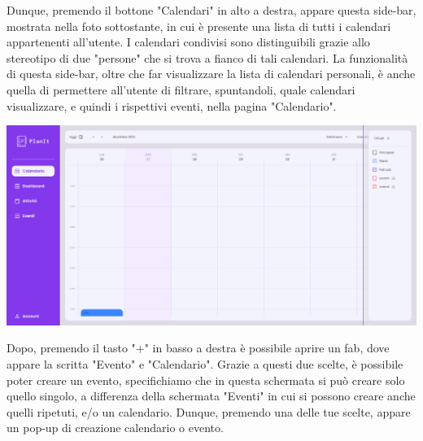 Dunque, premendo il bottone "Calendari" in alto a destra, appare questa side-bar, mostrata nella foto sottostante, in cui è presente una lista di tutti i calendari appartenenti all'utente. I calendari condivisi sono distinguibili grazie allo stereotipo di due "persone" che si trova a fianco di tali calendari. La funzionalità di questa side-bar, oltre che far visualizzare la lista di calendari personali, è anche quella di permettere all'utente di filtrare, spuntandoli, quale calendari visualizzare, e quindi i rispettivi eventi, nella pagina "Calendario".

\begin{center}
    \includegraphics[width=1\textwidth, height=0.3\textheight]{img/png/FrontEnd/Calendario/calendario_calendari.png}
\end{center}

Dopo, premendo il tasto "+" in basso a destra è possibile aprire un fab, dove appare la scritta "Evento" e "Calendario". Grazie a questi due scelte, è possibile poter creare un evento, specifichiamo che in questa schermata si può creare solo quello singolo, a differenza della schermata "Eventi" in cui si possono creare anche quelli ripetuti, e/o un calendario. Dunque, premendo una delle tue scelte, appare un pop-up di creazione calendario o evento.

